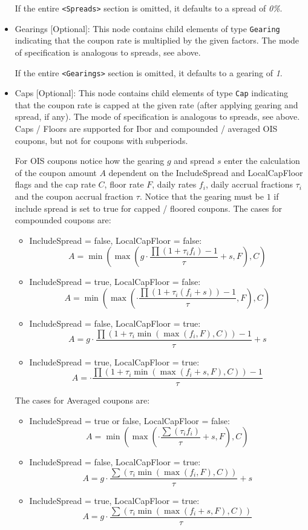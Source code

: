 \begin{itemize}
If the entire {\tt <Spreads>} section is omitted, it defaults to a spread of \emph{0\%}.

\item Gearings [Optional]: This node contains child elements of type \lstinline!Gearing! indicating that the coupon rate is
  multiplied by the given factors. The mode of specification is analogous to spreads, see above.
  
If the entire {\tt <Gearings>} section is omitted, it defaults to a gearing of \emph{1}.

\item Caps [Optional]: This node contains child elements of type \lstinline!Cap! indicating that the coupon rate is
  capped at the given rate (after applying gearing and spread, if any). The mode of specification is analogous to
  spreads, see above. Caps / Floors are supported for Ibor and compounded / averaged OIS coupons, but not for coupons
  with subperiods.

  For OIS coupons notice how the gearing $g$ and spread $s$ enter the calculation of the coupon amount $A$ dependent on
  the IncludeSpread and LocalCapFloor flags and the cap rate $C$, floor rate $F$, daily rates $f_i$, daily accrual
  fractions $\tau_i$ and the coupon accrual fraction $\tau$. Notice that the gearing must be $1$ if include spread is
  set to true for capped / floored coupons. The cases for compounded coupons are:
  \begin{itemize}
  \item IncludeSpread = false, LocalCapFloor = false:\\
    $$ A = \min \left( \max \left( g \cdot \frac{\prod (1 + \tau_i f_i) - 1}{\tau} + s, F \right), C \right)$$
  \item IncludeSpread = true, LocalCapFloor = false:\\
    $$ A = \min \left( \max \left( \cdot \frac{\prod (1 + \tau_i(f_i + s)) - 1}{\tau}, F \right), C \right)$$
  \item IncludeSpread = false, LocalCapFloor = true:\\
    $$ A = g \cdot \frac{\prod (1 + \tau_i \min ( \max ( f_i , F), C)) - 1}{\tau} + s $$
  \item IncludeSpread = true, LocalCapFloor = true:\\
    $$ A = \cdot \frac{\prod (1 + \tau_i \min ( \max ( f_i + s , F), C)) - 1}{\tau} $$
  \end{itemize}
  The cases for Averaged coupons are:
  \begin{itemize}
  \item IncludeSpread = true or false, LocalCapFloor = false:\\
    $$ A = \min \left( \max \left( \cdot \frac{\sum (\tau_i f_i)}{\tau} + s, F \right), C \right)$$
  \item IncludeSpread = false, LocalCapFloor = true:\\
    $$ A = g \cdot \frac{\sum (\tau_i \min ( \max ( f_i , F), C))}{\tau} + s $$
  \item IncludeSpread = true, LocalCapFloor = true:\\
    $$ A = g \cdot \frac{\sum (\tau_i \min ( \max ( f_i + s , F), C))}{\tau} $$
  \end{itemize}


\end{itemize}
